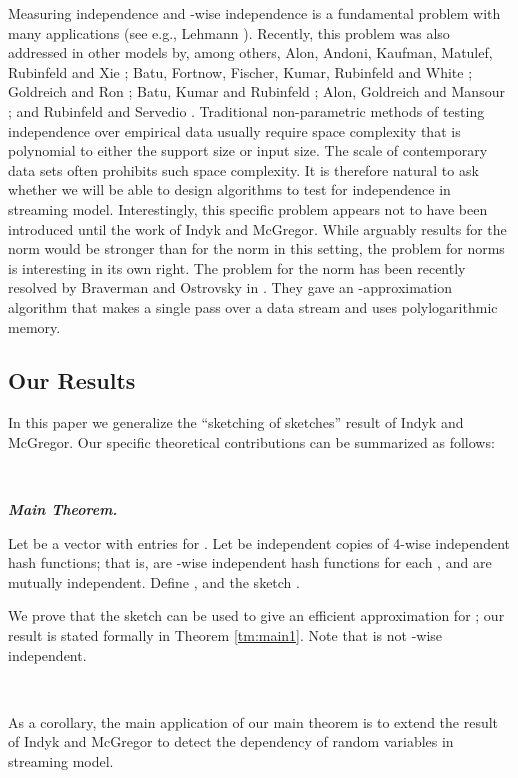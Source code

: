 \def\draft{0}  \documentclass[proceedings]{stacs}
\theoremstyle{plain}\newtheorem{satz}[thm]{Satz}
\theoremstyle{definition}\newtheorem{crucial}[thm]{Crucial Definition}
\begin{document}
Measuring
independence and -wise independence is a fundamental problem with
many applications (see e.g., Lehmann \cite{stat}). Recently, this problem was also addressed in other models by, among
others, Alon, Andoni, Kaufman, Matulef, Rubinfeld and Xie
\cite{k-wise_independenc}; Batu, Fortnow, Fischer, Kumar, Rubinfeld
and White \cite{batu_independence}; Goldreich and Ron \cite{ind1};
Batu, Kumar and Rubinfeld \cite{ind2}; Alon, Goldreich and Mansour
\cite{ind3}; and Rubinfeld and Servedio \cite{ind4}.
Traditional non-parametric methods of testing independence over empirical data
usually require space complexity that is polynomial to either the support
size or input size. The scale of contemporary data sets often
prohibits such space complexity.  It is therefore natural to ask
whether we will be able to design algorithms to test for independence
in streaming model. Interestingly, this specific problem appears not
to have been introduced until the work of Indyk and McGregor.  While
arguably results for the  norm would be stronger than for
the  norm in this setting, the problem for  norms
is interesting in its own right. The problem for the  norm has been
recently resolved by Braverman and Ostrovsky in \cite{BO03}. They gave an -approximation algorithm
that makes a single pass over a data stream and uses polylogarithmic memory.

\subsection{Our Results}
In this paper we generalize the ``sketching of sketches''
result of Indyk and McGregor.
Our specific theoretical contributions can be summarized as follows:

\ \

\noindent
\emph{\textbf{Main Theorem. }}


\noindent
Let  be a vector with entries  for .
Let  be independent copies of 4-wise independent hash functions;  that is,  are -wise independent hash functions for each , and  are mutually independent.  Define , and the sketch .

We prove that the sketch  can be used to give an efficient approximation for ; our result is stated formally in Theorem \ref{tm:main1}. Note that  is not -wise independent.

\ \ \



As a corollary, the main application of our main theorem is to extend the result of Indyk and McGregor \cite{IM08} to detect the dependency of  random variables in streaming model.
\end{document}
